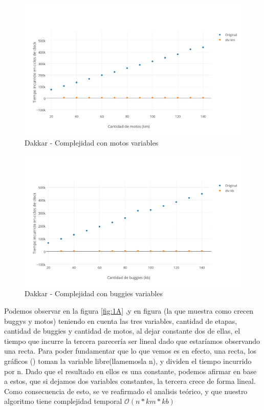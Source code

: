 \begin{figure}[htb]
	\begin{center}
    		\includegraphics[scale=0.5]{imagenes/1B km.png}
	\end{center}
	\caption{Dakkar - Complejidad con motos variables}\label{fig:1B}
\end{figure}

\begin{figure}[htb]
	\begin{center}
    		\includegraphics[scale=0.5]{imagenes/1B kb.png}
	\end{center}
	\caption{Dakkar - Complejidad con buggies variables}\label{fig:1C}
\end{figure}

Podemos observar en la figura \ref{fig:1A} ,y en figura (la que muestra como crecen buggys y motos) teniendo en cuenta las tres variables, cantidad de etapas, cantidad de buggies y cantidad de motos, al dejar constante dos de ellas, el tiempo que incurre la tercera parecería ser lineal dado que estaríamos observando una recta. Para poder fundamentar que lo que vemos es en efecto, una recta, los gráficos () toman la variable libre(llamemosla n), y dividen el tiempo incurrido por n. Dado que el resultado en ellos es una constante, podemos afirmar en base a estos, que si dejamos dos variables constantes, la tercera crece de forma lineal. Como consecuencia de esto, se ve reafirmado el analisis teórico, y que nuestro algoritmo tiene complejidad temporal $\mathcal{O}(n*km*kb)$



